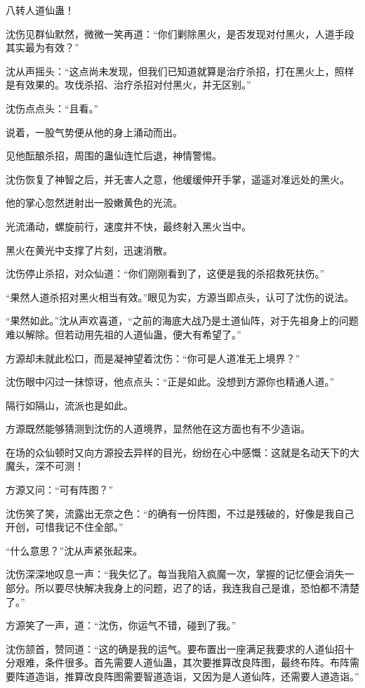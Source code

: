 \begin{this_body}
八转人道仙蛊！

沈伤见群仙默然，微微一笑再道：“你们剿除黑火，是否发现对付黑火，人道手段其实最为有效？”

沈从声摇头：“这点尚未发现，但我们已知道就算是治疗杀招，打在黑火上，照样是有效果的。攻伐杀招、治疗杀招对付黑火，并无区别。”

沈伤点点头：“且看。”

说着，一股气势便从他的身上涌动而出。

见他酝酿杀招，周围的蛊仙连忙后退，神情警惕。

沈伤恢复了神智之后，并无害人之意，他缓缓伸开手掌，遥遥对准远处的黑火。

他的掌心忽然迸射出一股嫩黄色的光流。

光流涌动，螺旋前行，速度并不快，最终射入黑火当中。

黑火在黄光中支撑了片刻，迅速消散。

沈伤停止杀招，对众仙道：“你们刚刚看到了，这便是我的杀招救死扶伤。”

“果然人道杀招对黑火相当有效。”眼见为实，方源当即点头，认可了沈伤的说法。

“果然如此。”沈从声欢喜道，“之前的海底大战乃是土道仙阵，对于先祖身上的问题难以解除。但若动用先祖的人道仙蛊，便大有希望了。”

方源却未就此松口，而是凝神望着沈伤：“你可是人道准无上境界？”

沈伤眼中闪过一抹惊讶，他点点头：“正是如此。没想到方源你也精通人道。”

隔行如隔山，流派也是如此。

方源既然能够猜测到沈伤的人道境界，显然他在这方面也有不少造诣。

在场的众仙顿时又向方源投去异样的目光，纷纷在心中感慨：这就是名动天下的大魔头，深不可测！

方源又问：“可有阵图？”

沈伤笑了笑，流露出无奈之色：“的确有一份阵图，不过是残破的，好像是我自己开创，可惜我记不住全部。”

“什么意思？”沈从声紧张起来。

沈伤深深地叹息一声：“我失忆了。每当我陷入疯魔一次，掌握的记忆便会消失一部分。所以要尽快解决我身上的问题，迟了的话，我连我自己是谁，恐怕都不清楚了。”

方源笑了一声，道：“沈伤，你运气不错，碰到了我。”

沈伤颔首，赞同道：“这的确是我的运气。要布置出一座满足我要求的人道仙招十分艰难，条件很多。首先需要人道仙蛊，其次要推算改良阵图，最终布阵。布阵需要阵道造诣，推算改良阵图需要智道造诣，又因为是人道仙阵，还需要人道造诣。”


\end{this_body}
